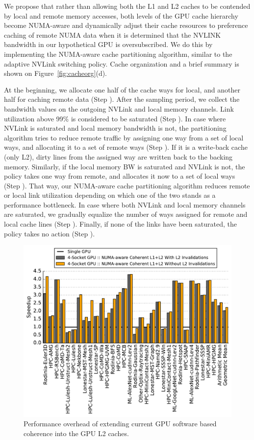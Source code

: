 We propose that rather than allowing both the L1 and L2 caches to be 
contended by local and remote memory accesses, both levels of the GPU cache 
hierarchy become NUMA-aware and dynamically adjust their cache resources to 
preference caching of remote NUMA data when it is determined that the NVLINK 
bandwidth in our hypothetical GPU is oversubscribed. We do this by 
implementing the NUMA-aware cache partitioning algorithm, similar to the 
adaptive NVLink switching policy. Cache organization and a brief summary is 
shown on Figure~\ref{fig:cacheorg}(d). 

At the beginning, we allocate one half of the cache ways for local, and 
another half for caching remote data (Step ). After the sampling 
period, we collect the bandwidth values on the outgoing NVLink and local 
memory channels. Link utilization above 99\% is considered to be saturated 
(Step ). In case where NVLink is saturated and local memory 
bandwidth is not, the partitioning algorithm tries to reduce remote traffic 
by assigning one way from a set of local ways, and allocating it to a set of 
remote ways (Step ). If it is a write-back cache (only L2), dirty 
lines from the assigned way are written back to the backing memory. 
Similarly, if the local memory BW is saturated and NVLink is not, the policy 
takes one way from remote, and allocates it now to a set of local ways (Step 
). That way, our NUMA-aware cache partitioning algorithm reduces 
remote or local link utilization depending on which one of the two stands as 
a performance bottleneck. In case where both NVLink and local memory channels 
are saturated, we gradually equalize the number of ways assigned for remote 
and local cache lines (Step ). Finally, if none of the links have 
been saturated, the policy takes no action (Step ).

\begin{figure}[t]
    \centering
    \includegraphics[width=1.0\columnwidth]{figures/plot_no_inval_WB.pdf}
    \caption{Performance overhead of extending current GPU software based coherence
    into the GPU L2 caches.}
    \label{fig:invalidations}
    \vspace{-.2in}
\end{figure}

